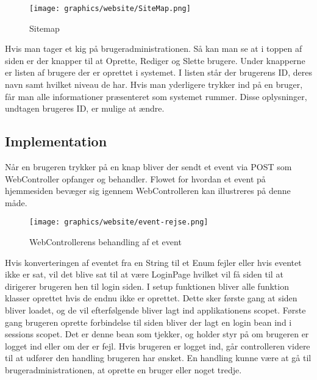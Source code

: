 \documentclass[a4paper]{article}
\newenvironment{changemargin}[2]{%
\begin{list}{}{%
\setlength{\topsep}{0pt}%
\setlength{\leftmargin}{#1}%
\setlength{\rightmargin}{#2}%
\setlength{\listparindent}{\parindent}%
\setlength{\itemindent}{\parindent}%
\setlength{\parsep}{\parskip}%
}%
\item[]}{\end{list}}
\begin{document}
\begin{figure}[h!]
\begin{changemargin}{-2cm}{-1cm}
  \centering
  \texttt{[image: graphics/website/SiteMap.png]}
  \caption{Sitemap}
\end{changemargin}
\end{figure}


Hvis man tager et kig på brugeradministrationen. Så kan man se at i toppen af siden er der knapper til at Oprette, Rediger og Slette brugere. Under knapperne er listen af brugere der er oprettet i systemet. I listen står der brugerens ID, deres navn samt hvilket niveau de har. Hvis man yderligere trykker ind på en bruger, får man alle informationer præsenteret som systemet rummer.  Disse oplysninger, undtagen brugeres ID, er mulige at ændre. 



\subsection{Implementation} %

Når en brugeren trykker på en knap bliver der sendt et event via POST som WebController opfanger og behandler. Flowet for hvordan et event på hjemmesiden bevæger sig igennem WebControlleren kan illustreres på denne måde. 
 
\begin{figure}[h!]
  \centering
  \texttt{[image: graphics/website/event-rejse.png]}
  \caption{WebControllerens behandling af et event}
\end{figure}

Hvis konverteringen af  eventet fra en String til et Enum fejler eller hvis eventet ikke er sat, vil det blive sat til at være LoginPage hvilket vil få siden til at dirigerer brugeren hen til login siden. I setup funktionen bliver alle funktion klasser oprettet hvis de endnu ikke er oprettet. Dette sker første gang at siden bliver loadet, og de vil efterfølgende bliver lagt ind applikationens scopet. Første gang brugeren oprette forbindelse til siden bliver der lagt en login bean ind i sessions scopet. Det er denne bean som tjekker, og holder styr på om brugeren er logget ind eller om der er fejl. Hvis brugeren er logget ind, går controlleren videre til at udfører den handling brugeren har ønsket. En handling kunne være at gå til brugeradministrationen, at oprette en bruger eller noget tredje. 
\end{document}
